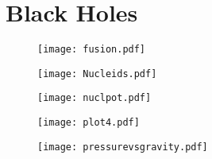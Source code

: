 \chapter{Black Holes}
\begin{figure}[hbtp!]
\centering
 \texttt{[image: fusion.pdf]}
\caption{}
\end{figure}
\begin{figure}[hbtp!]
\centering
 \texttt{[image: Nucleids.pdf]}
\caption{}
\end{figure}
\begin{figure}[hbtp!]
\centering
 \texttt{[image: nuclpot.pdf]}
\caption{}
\end{figure}
\begin{figure}[hbtp!]
\centering
 \texttt{[image: plot4.pdf]}
\caption{}
\end{figure}
\begin{figure}[hbtp!]
\centering
 \texttt{[image: pressurevsgravity.pdf]}
\caption{}
\end{figure}
